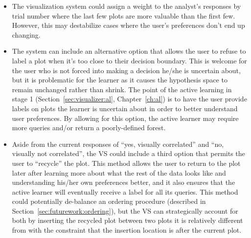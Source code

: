 \tablespacing
\begin{itemize}
	\item The visualization system could assign a weight to the analyst's 
	responses by trial number where the last few plots are more valuable than 
	the first few. However, this may destabilize cases where the user's 
	preferences don't end up changing.
	
	\item The system can include an alternative option that allows the user to 
	refuse to label a plot when it's too close to their decision boundary. This 
	is welcome for the user who is not forced into making a decision he/she is 
	uncertain about, but it is problematic for the learner as it causes the 
	hypothesis space to remain unchanged rather than shrink. The point of the 
	active learning in stage 1 (Section~\ref{sec:visualizer:al}, 
	Chapter~\ref{ch:al}) is to have the user provide labels on plots the 
	learner is uncertain about in order to 
	better understand user preferences. By allowing for this option, the active
	learner may require more queries and/or return a poorly-defined forest. 
	
	\item Aside from the current responses of ``yes, visually correlated'' and 
	``no, visually not correlated'', the VS could 
	include a third option that permits the user to ``recycle'' the plot. This 
	method allows the user to return to the plot later after learning more 
	about what the rest of the data looks like and understanding his/her own 
	preferences better, and it also ensures that the active learner will 
	eventually receive a label for all its queries. This method could 
	potentially de-balance an ordering procedure (described in 
	Section~\ref{sec:futurework:ordering}), but the VS can strategically 
	account for both by inserting the recycled plot between two plots it is 
	relatively different from with the constraint that the insertion location 
	is after the current plot.
\end{itemize}
\bodyspacing
